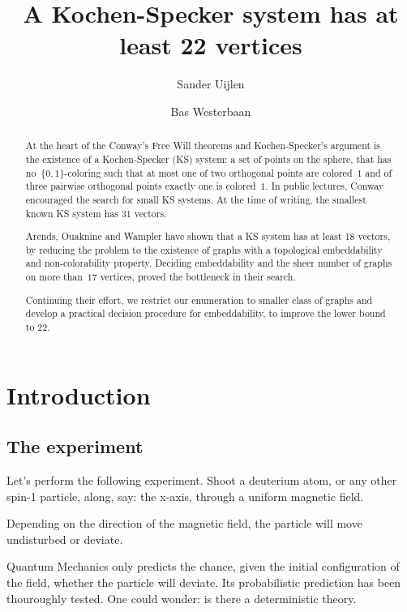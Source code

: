 \documentclass[a4paper]{article}
\title{A Kochen-Specker system has at least 22 vertices}
\author{Sander Uijlen}
\author{Bas Westerbaan}
\affil{Institute for Computing and Information Sciences\\
       Radboud Universiteit Nijmegen\\
   \{\texttt{suijlen},\texttt{bwesterb}\}\texttt{@cs.ru.nl}}
\theoremstyle{definition}
\theoremstyle{remark}
\begin{document}
\maketitle

\begin{abstract}
    At the heart of the Conway's Free Will theorems and Kochen-Specker's
        argument
    is the existence of a Kochen-Specker (KS) system:
    a set of points on the sphere,
    that has no~$\{0,1\}$-coloring such that
    at most one of two orthogonal points are colored~$1$
    and of three pairwise orthogonal points exactly one
    is colored~$1$.
    In public lectures, Conway encouraged the search for small
    KS systems.  
    At the time of writing, the smallest known
    KS system has 31 vectors.  

    Arends, Ouaknine and Wampler have shown that a KS system has at least
    18 vectors, by reducing the problem to the existence of graphs
    with a topological embeddability and non-colorability property.
    Deciding embeddability and the sheer number of graphs on more than~$17$
    vertices, proved the bottleneck in their search.

    Continuing their effort, we restrict our enumeration to smaller class of
    graphs and develop a practical decision procedure for embeddability, to
    improve the lower bound to 22.
\end{abstract}
    
\section{Introduction}

\subsection{The experiment}

Let's perform the following experiment.  Shoot a deuterium atom,
or any other spin-1 particle,
along, say: the x-axis, through a uniform magnetic field.

Depending on the direction of the magnetic field,
the particle will move undisturbed
or deviate.

Quantum Mechanics only predicts the chance, given the initial configuration
of the field, whether the particle will deviate.
Its probabilistic prediction has been thouroughly tested.
One could wonder: is there a deterministic theory.
\end{document}
